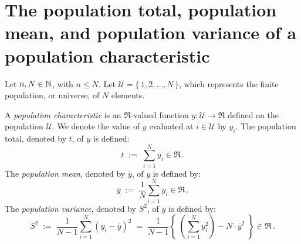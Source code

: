 \documentclass{article}
\begin{document}


\pagestyle{fancy}

%

\lfoot[]{}
\cfoot[]{}
\rfoot[]{\thepage}



\mbox{}\vskip 0.0cm
\section{The population total, population mean, and population variance of a population characteristic}
\setcounter{theorem}{0}

Let $n, N \in \mathbb{N}$, with $n \leq N$.  Let $\mathcal{U} = \{\,1,2,\ldots,N\,\}$, which represents the finite population, or universe, of $N$ elements.  

\begin{definition}\quad
A \emph{population characteristic} is an $\Re$-valued function $y : \mathcal{U} \longrightarrow \Re$ defined on the population $\mathcal{U}$.  We denote the value of $y$ evaluated at $i \in \mathcal{U}$ by $y_{i}$.
The {population total}, denoted by $t$, of $y$ is defined:
\begin{equation*}
    t \; := \; \sum^{N}_{i=1} y_{i} \in \Re\,.
\end{equation*}
The \emph{population mean}, denoted by $\overline{y}$, of $y$ is defined by:
\begin{equation*}
    \overline{y} \; := \; \dfrac{1}{N}\sum^{N}_{i=1} y_{i} \in \Re\,.
\end{equation*}
The \emph{population variance}, denoted by $S^{2}$, of $y$ is defined by:
\begin{equation*}
    S^{2} \; := \; \dfrac{1}{N-1}\sum^{N}_{i=1} \left(y_{i}-\overline{y}\right)^{2}
             \; = \; \dfrac{1}{N-1}\left\{\;\left(\sum^{N}_{i=1}y_{i}^{2}\right) - N\cdot\overline{y}^{2} \;\right\} \in \Re\,.
\end{equation*}
\end{definition}
\end{document}
